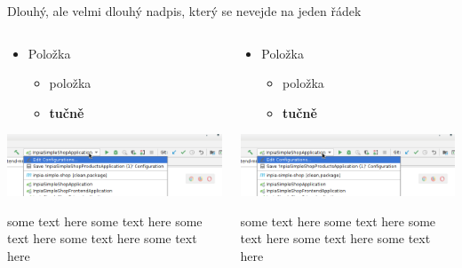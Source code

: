 \documentclass{beamer}
\begin{document}
\begin{frame}[fragile, shrink=20]{Dlouhý, ale velmi dlouhý nadpis, který se nevejde na jeden řádek}


\begin{columns}
	\begin{column}{0.5\textwidth}
		\begin{itemize}
			\item Položka
			\begin{itemize}
				\item položka
				\item \textbf{tučně}
			\end{itemize}
		\end{itemize}
		\includegraphics[width=\linewidth]{images/idea-app-configuration.png} 
		
		some text here some text here some text here some text here some text here
	\end{column}
	\begin{column}{0.5\textwidth}  
		\begin{center}
			\begin{itemize}
				\item Položka
				\begin{itemize}
					\item položka
					\item \textbf{tučně}
				\end{itemize}
			\end{itemize}
			
			\includegraphics[width=\linewidth]{images/idea-app-configuration.png} 
			
			some text here some text here some text here some text here some text here
		\end{center}
	\end{column}
\end{columns}


\end{frame}
\end{document}
